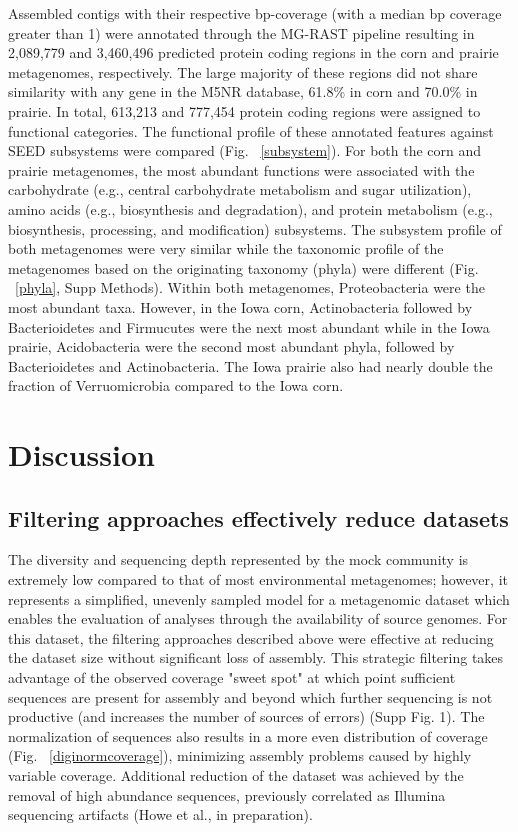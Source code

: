 \documentclass[11pt]{article} %
\begin{document}
Assembled contigs with their respective bp-coverage (with a median bp
coverage greater than 1) were annotated through the MG-RAST pipeline
resulting in 2,089,779 and 3,460,496 predicted protein coding regions
in the corn and prairie metagenomes, respectively.  The large majority
of these regions did not share similarity with any gene in the M5NR
database, 61.8\% in corn and 70.0\% in prairie.  In total, 613,213 and
777,454 protein coding regions were assigned to functional categories.
The functional profile of these annotated features against SEED
subsystems were compared (Fig. ~\ref{subsystem}).  For both the corn
and prairie metagenomes, the most abundant functions were associated
with the carbohydrate (e.g., central carbohydrate metabolism and sugar
utilization), amino acids (e.g., biosynthesis and degradation), and
protein metabolism (e.g., biosynthesis, processing, and modification)
subsystems.  The subsystem profile of both metagenomes were very
similar while the taxonomic profile of the metagenomes based on the
originating taxonomy (phyla) were different (Fig. ~\ref{phyla}, Supp
Methods).  Within both metagenomes, Proteobacteria were the most
abundant taxa.  However, in the Iowa corn, Actinobacteria followed by
Bacterioidetes and Firmucutes were the next most abundant while in the
Iowa prairie, Acidobacteria were the second most abundant phyla,
followed by Bacterioidetes and Actinobacteria.  The Iowa prairie also
had nearly double the fraction of Verruomicrobia compared to the Iowa
corn.


\section{Discussion}

\subsection{Filtering approaches effectively reduce datasets} 

The diversity and sequencing depth represented by the mock community
is extremely low compared to that of most environmental metagenomes;
however, it represents a simplified, unevenly sampled model for a
metagenomic dataset which enables the evaluation of analyses through
the availability of source genomes.  For this dataset, the filtering
approaches described above were effective at reducing the dataset size
without significant loss of assembly.  This strategic filtering takes
advantage of the observed coverage "sweet spot" at which point
sufficient sequences are present for assembly and beyond which further
sequencing is not productive (and increases the number of sources of
errors) (Supp Fig. 1).  The normalization of sequences also results in
a more even distribution of coverage (Fig. ~\ref{diginormcoverage}),
minimizing assembly problems caused by highly variable coverage.
Additional reduction of the dataset was achieved by the removal of
high abundance sequences, previously correlated as Illumina sequencing
artifacts (Howe et al., in preparation).
\end{document}
